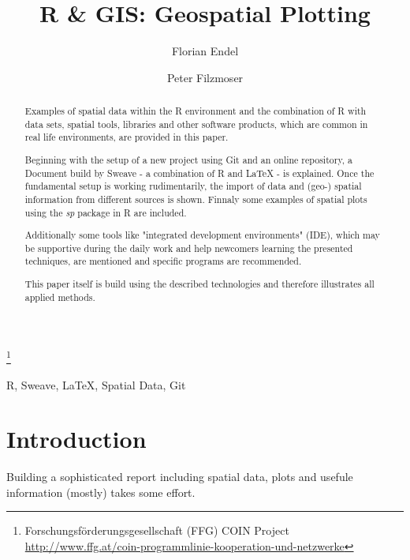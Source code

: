 \documentclass{ifacconf}
\begin{document}
\begin{frontmatter}

\title{R \& GIS: Geospatial Plotting} 

\thanks[footnoteinfo]{Forschungsförderungsgesellschaft (FFG) COIN Project
\url{http://www.ffg.at/coin-programmlinie-kooperation-und-netzwerke}}

\author[First]{Florian Endel} 
\author[Second]{Peter Filzmoser} 

\address[First]{FFG IFEDH project, Student at Vienna University of Technology (e-mail: florian@endel.at).}
\address[Second]{Department of Statistics and Probability Theory,
Vienna University of Technology (e-mail: P.Filzmoser@tuwien.ac.at)}

\begin{abstract}                %
Examples of spatial data within the R environment and the 
combination of R with data sets, spatial
tools, libraries and other software products, which are common 
in real life environments, are provided in this paper.

Beginning with the setup of a new project using Git 
and an online repository, a Document build by Sweave - a
combination of R and \LaTeX{} - is explained. Once the 
fundamental setup is working rudimentarily, the import
of data and (geo-) spatial information from different 
sources is shown. Finnaly some examples of spatial plots
using the \textit{sp} package in R are  included.

Additionally some tools like "integrated development environments" (IDE), 
which may be supportive during the daily work
and help newcomers learning the presented techniques, 
are mentioned and specific programs are recommended.

This paper itself is build using the described technologies and therefore illustrates 
all applied methods. 
\end{abstract}

\begin{keyword}
R, Sweave, \LaTeX{}, Spatial Data, Git
\end{keyword}

\end{frontmatter}

\section{Introduction}
Building a sophisticated report including spatial data, plots and usefule information
(mostly) takes some effort.
\end{document}
